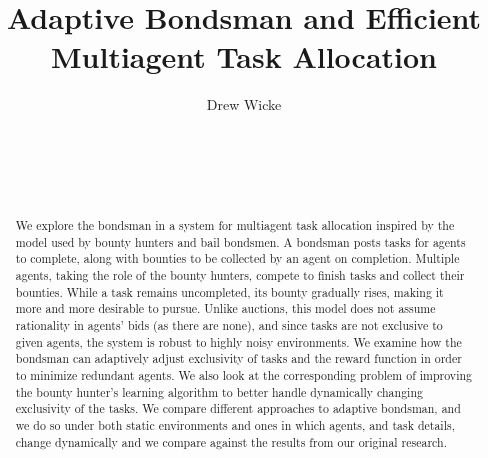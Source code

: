 \documentclass[letterpaper]{aamas2015}
\begin{document}
\title{Adaptive Bondsman and Efficient Multiagent Task Allocation}


\author{
%
\alignauthor
Drew Wicke\\
       \\
       \\
       \\
       \\
       }


\maketitle

\begin{abstract}

We explore the bondsman in a system for multiagent task allocation inspired by the model used by bounty hunters and bail bondsmen.  A bondsman posts tasks for agents to complete, along with bounties to be collected by an agent on completion.  Multiple agents, taking the role of the bounty hunters, compete to finish tasks and collect their bounties.  While a task remains uncompleted, its bounty gradually rises, making it more and more desirable to pursue.  Unlike auctions, this model does not assume rationality in agents' bids (as there are none), and since tasks are not exclusive to given agents, the system is robust to highly noisy environments.  We examine how the bondsman can adaptively adjust exclusivity of tasks and the reward function in order to minimize redundant agents.  We also look at the corresponding problem of improving the bounty hunter's learning algorithm to better handle dynamically changing exclusivity of the tasks. We compare different approaches to adaptive bondsman, and we do so under both static environments and ones in which agents, and task details, change dynamically and we compare against the results from our original research.  

\end{abstract}
\end{document}
